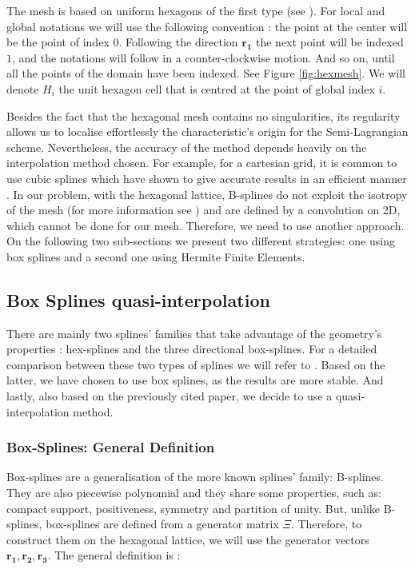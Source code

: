 \documentclass[proc]{edpsmath}
\begin{document}
The mesh is based on uniform hexagons of the first type (see \cite{Ulichney87}). For local and global notations we will use the following convention : the point at the center will be the point of index $0$. Following the direction $\mathbf{r_1}$ the next point will be indexed $1$, and the notations will follow in a counter-clockwise motion. And so on, until all the points of the domain have been indexed. See Figure \ref{fig:hexmesh}. We will denote $H_i$ the unit hexagon cell that is centred at the point of global index $i$.

Besides the fact that the hexagonal mesh contains no singularities, its regularity allows us to localise effortlessly the characteristic's origin for the Semi-Lagrangian scheme. Nevertheless, the accuracy of the method depends heavily on the interpolation method chosen. For example, for a cartesian grid, it is common to use cubic splines which have shown to give accurate results in an efficient manner \cite{Sonnendrücker1999201}. In our problem, with the hexagonal lattice, B-splines do not exploit the isotropy of the mesh (for more information see \cite{Mersereau79-IEEE}) and are defined by a convolution on 2D, which cannot be done for our mesh. Therefore, we need to use another approach. On the following two sub-sections we present two different strategies: one using box splines and a second one using Hermite Finite Elements.


\subsection{Box Splines quasi-interpolation}

There are mainly two splines' families that take advantage of the geometry's properties : hex-splines and the three directional box-splines. For a detailed comparison between these two types of splines we will refer to \cite{Condat2007}. Based on the latter, we have chosen to use box splines, as the results are more stable. And lastly, also based on the previously cited paper, we decide to use a quasi-interpolation method.

\subsubsection{Box-Splines: General Definition}

Box-splines are a generalisation of the more known splines' family: B-splines. They are also piecewise polynomial and they share some properties, such as: compact support, positiveness, symmetry and partition of unity. But, unlike B-splines, box-splines are defined from a generator matrix $\Xi$. Therefore, to construct them on the hexagonal lattice, we will use the generator vectors $\mathbf{r_1, r_2, r_3}$. The general definition is \cite{Boor1993, Condat2006}:
\end{document}
